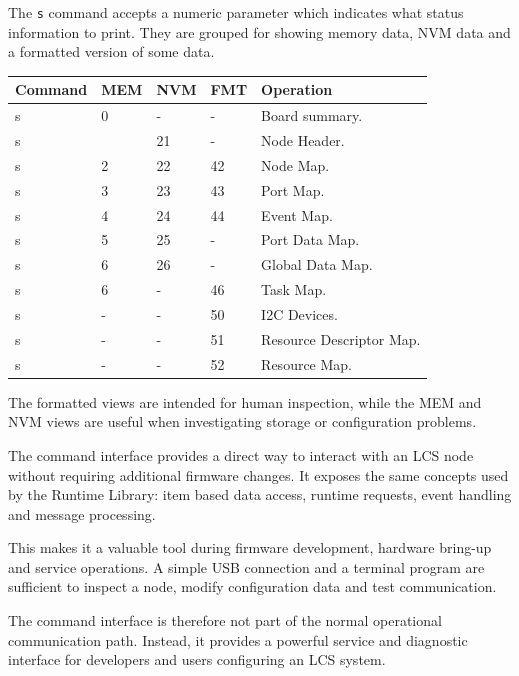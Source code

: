 The \texttt{s} command accepts a numeric parameter which indicates what status 
information to print. They are grouped for showing memory data, NVM data and a 
formatted version of some data.

\begin{table}[ht!]
    \begin{center}
        \renewcommand{\arraystretch}{1.2}
        \begin{tabularx}{0.9\textwidth}{|l|l|l|l|X|}
            \hline
            \textbf{Command} & \textbf{MEM}  & \textbf{NVM} & \textbf{FMT} & \textbf{Operation} \\
            \hline
            s & 0 & - & - & Board summary.\\
            \hline
            s & & 21 & - & Node Header.\\
            \hline
            s & 2 & 22 & 42 & Node Map.\\
            \hline
            s & 3 & 23 & 43 & Port Map.\\
            \hline
            s & 4 & 24 & 44 & Event Map.\\
            \hline
            s & 5 & 25 & - & Port Data Map.\\
            \hline
            s & 6 & 26 & - & Global Data Map.\\
            \hline
            s & 6 & - & 46 & Task Map.\\
            \hline
            s & - & - & 50 & I2C Devices.\\
            \hline
            s & - & - & 51 & Resource Descriptor Map.\\
            \hline
            s & - & - & 52 & Resource Map.\\
            \hline
        \end{tabularx}
    \end{center}
\end{table}
\FloatBarrier

The formatted views are intended for human inspection, while the MEM and NVM views are
useful when investigating storage or configuration problems.


The command interface provides a direct way to interact with an LCS node without
requiring additional firmware changes. 
It exposes the same concepts used by the Runtime Library: item based data access,
runtime requests, event handling and message processing. 

This makes it a valuable tool
during firmware development, hardware bring-up and service operations.
A simple USB connection and a terminal program are sufficient to inspect a node, modify
configuration data and test communication.

The command interface is therefore not part of the normal operational communication
path. Instead, it provides a powerful service and diagnostic interface for developers
and users configuring an LCS system.





